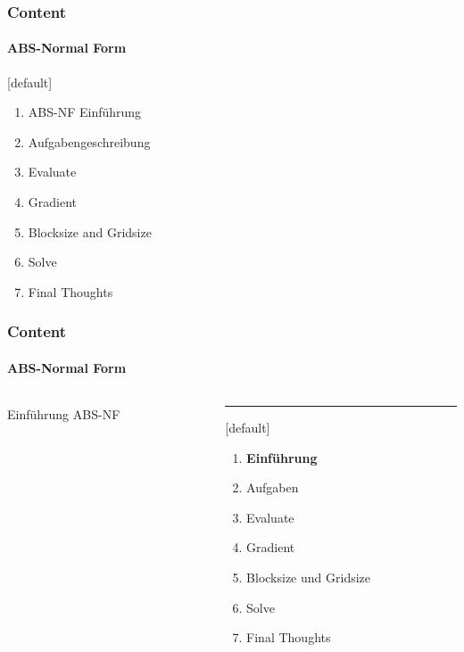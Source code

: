 \begin{frame}
	\frametitle{Content}
	\framesubtitle{ABS-Normal Form}
	[default]
	\fontsize{12pt}{7.2}\selectfont
	\begin{enumerate}
		\item ABS-NF Einführung
		\item Aufgabengeschreibung
		\item Evaluate
		\item Gradient
		\item Blocksize and Gridsize
		\item Solve
		\item Final Thoughts
	\end{enumerate}
\end{frame}

\begin{frame}
	\frametitle{Content}
	\framesubtitle{ABS-Normal Form}
	\begin{columns}[T] %
		\begin{column}{.48\textwidth}
			
			\begin{center}
				{\Huge Einführung ABS-NF}
			\end{center}
			
		\end{column}%
		\hfill%
		\begin{column}{.48\textwidth}
			\color{blue}\rule{\linewidth}{4pt}
			
			\begin{enumerate}
				\item \textbf{Einführung}
				\item Aufgaben
				\item Evaluate
				\item Gradient
				\item Blocksize und Gridsize
				\item Solve
				\item Final Thoughts
			\end{enumerate}
		\end{column}%
	\end{columns}
\end{frame}
